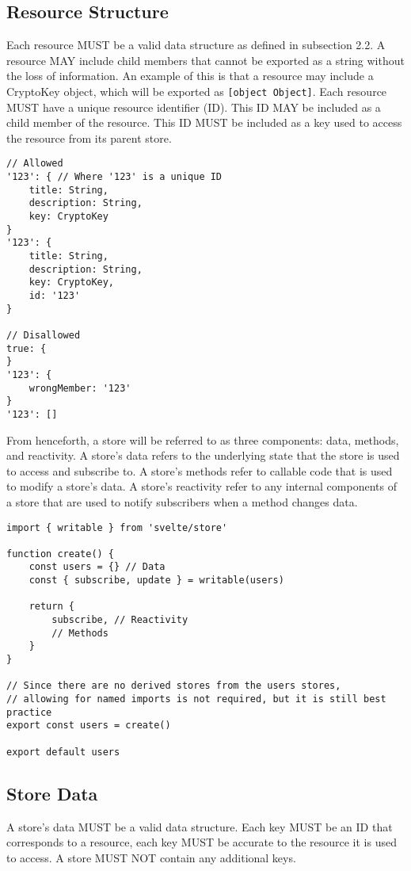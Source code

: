 \documentclass{article}
\begin{document}
\subsection{Resource Structure}
Each resource MUST be a valid data structure as defined in subsection 2.2. A resource MAY include child members that cannot be exported as a string without the loss of information. An example of this is that a resource may include a CryptoKey object, which will be exported as \verb|[object Object]|. Each resource MUST have a unique resource identifier (ID). This ID MAY be included as a child member of the resource. This ID MUST be included as a key used to access the resource from its parent store.

\begin{lstlisting}[caption=Valid Structures]
// Allowed
'123': { // Where '123' is a unique ID
    title: String,
    description: String,
    key: CryptoKey
}
'123': {
    title: String,
    description: String,
    key: CryptoKey,
    id: '123'
}

// Disallowed
true: {
}
'123': {
    wrongMember: '123'
}
'123': []
\end{lstlisting}

From henceforth, a store will be referred to as three components: data, methods, and reactivity. A store's data refers to the underlying state that the store is used to access and subscribe to. A store's methods refer to callable code that is used to modify a store's data. A store's reactivity refer to any internal components of a store that are used to notify subscribers when a method changes data.

\begin{lstlisting}[caption={Data, Reactivity, and Methods}]
import { writable } from 'svelte/store'

function create() {
    const users = {} // Data
    const { subscribe, update } = writable(users)
    
    return {
        subscribe, // Reactivity
        // Methods
    }
}

// Since there are no derived stores from the users stores,
// allowing for named imports is not required, but it is still best practice
export const users = create()

export default users
\end{lstlisting}

\subsection{Store Data}
A store's data MUST be a valid data structure. Each key MUST be an ID that corresponds to a resource, each key MUST be accurate to the resource it is used to access. A store MUST NOT contain any additional keys.
\end{document}

